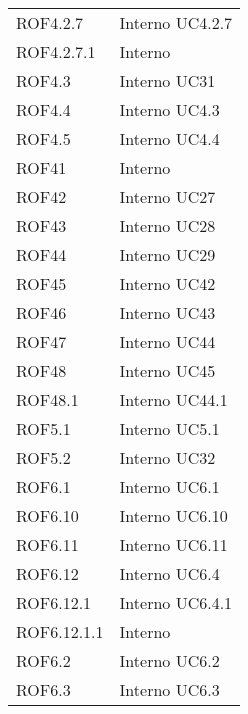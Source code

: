 \begin{longtable}{p{2.5cm}!{\VRule[1pt]}p{2.5cm}}
	ROF4.2.7 & Interno \newline UC4.2.7
	\\
	ROF4.2.7.1 & Interno \\
	ROF4.3 & Interno \newline UC31
	\\
	ROF4.4 & Interno \newline UC4.3
	\\
	ROF4.5 & Interno \newline UC4.4
	\\
	ROF41 & Interno \\
	ROF42 & Interno \newline UC27
	\\
	ROF43 & Interno \newline UC28
	\\
	ROF44 & Interno \newline UC29
	\\
	ROF45 & Interno \newline UC42
	\\
	ROF46 & Interno \newline UC43
	\\
	ROF47 & Interno \newline UC44
	\\
	ROF48 & Interno \newline UC45
	\\
	ROF48.1 & Interno \newline UC44.1
	\\
	ROF5.1 & Interno \newline UC5.1
	\\
	ROF5.2 & Interno \newline UC32
	\\
	ROF6.1 & Interno \newline UC6.1
	\\
	ROF6.10 & Interno \newline UC6.10
	\\
	ROF6.11 & Interno \newline UC6.11
	\\
	ROF6.12 & Interno \newline UC6.4
	\\
	ROF6.12.1 & Interno \newline UC6.4.1
	\\
	ROF6.12.1.1 & Interno \\
	ROF6.2 & Interno \newline UC6.2
	\\
	ROF6.3 & Interno \newline UC6.3

\end{longtable}
